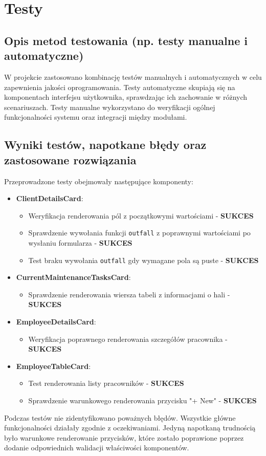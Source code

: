 \documentclass[../../spr.tex]{subfiles}
\begin{document}
\section{Testy}
\subsection{Opis metod testowania (np. testy manualne i automatyczne)}
W projekcie zastosowano kombinację testów manualnych i automatycznych w celu zapewnienia jakości oprogramowania. Testy automatyczne skupiają się na komponentach interfejsu użytkownika, sprawdzając ich zachowanie w różnych scenariuszach. Testy manualne wykorzystano do weryfikacji ogólnej funkcjonalności systemu oraz integracji między modułami.

\subsection{Wyniki testów, napotkane błędy oraz zastosowane rozwiązania}
Przeprowadzone testy obejmowały następujące komponenty:

\begin{itemize}
    \item \textbf{ClientDetailsCard}:
    \begin{itemize}
        \item Weryfikacja renderowania pól z początkowymi wartościami - \textbf{SUKCES}
        \item Sprawdzenie wywołania funkcji \texttt{outfall} z poprawnymi wartościami po wysłaniu formularza - \textbf{SUKCES}
        \item Test braku wywołania \texttt{outfall} gdy wymagane pola są puste - \textbf{SUKCES}
    \end{itemize}
    
    \item \textbf{CurrentMaintenanceTasksCard}:
    \begin{itemize}
        \item Sprawdzenie renderowania wiersza tabeli z informacjami o hali - \textbf{SUKCES}
    \end{itemize}
    
    \item \textbf{EmployeeDetailsCard}:
    \begin{itemize}
        \item Weryfikacja poprawnego renderowania szczegółów pracownika - \textbf{SUKCES}
    \end{itemize}
    
    \item \textbf{EmployeeTableCard}:
    \begin{itemize}
        \item Test renderowania listy pracowników - \textbf{SUKCES}
        \item Sprawdzenie warunkowego renderowania przycisku "+ New" - \textbf{SUKCES}
    \end{itemize}
\end{itemize}

Podczas testów nie zidentyfikowano poważnych błędów. Wszystkie główne funkcjonalności działały zgodnie z oczekiwaniami. Jedyną napotkaną trudnością było warunkowe renderowanie przycisków, które zostało poprawione poprzez dodanie odpowiednich walidacji właściwości komponentów.
\end{document}
